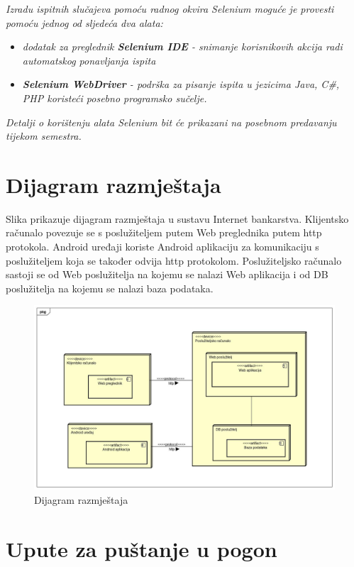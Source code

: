			 \textit{Izradu ispitnih slučajeva pomoću radnog okvira Selenium moguće je provesti pomoću jednog od sljedeća dva alata:}
			 \begin{itemize}
			 	\item \textit{dodatak za preglednik \textbf{Selenium IDE} - snimanje korisnikovih akcija radi automatskog ponavljanja ispita	}
			 	\item \textit{\textbf{Selenium WebDriver} - podrška za pisanje ispita u jezicima Java, C\#, PHP koristeći posebno programsko sučelje.}
			 \end{itemize}
		 	\textit{Detalji o korištenju alata Selenium bit će prikazani na posebnom predavanju tijekom semestra.}
			
			\eject 
		
		
		\section{Dijagram razmještaja}
			
			Slika prikazuje dijagram razmještaja u sustavu Internet bankarstva. Klijentsko računalo povezuje se s poslužiteljem putem Web preglednika putem http protokola. Android uređaji koriste Android aplikaciju za komunikaciju s poslužiteljem koja se također odvija http protokolom. Poslužiteljsko računalo sastoji se od Web poslužitelja na kojemu se nalazi Web aplikacija i od DB poslužitelja na kojemu se nalazi baza podataka.
			
			\begin{figure}[H]
				\includegraphics[scale=0.3]{Slike/dijagram_razmjestaja.jpg}
				\centering
				\caption{Dijagram razmještaja}
				\label{fig:dijagram}
			\end{figure}
		
		\section{Upute za puštanje u pogon}
		
